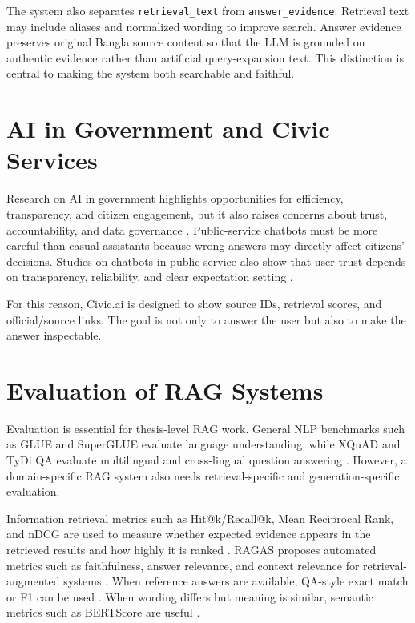 The system also separates \texttt{retrieval\_text} from \texttt{answer\_evidence}. Retrieval text may include aliases and normalized wording to improve search. Answer evidence preserves original Bangla source content so that the LLM is grounded on authentic evidence rather than artificial query-expansion text. This distinction is central to making the system both searchable and faithful.

\section{AI in Government and Civic Services}
Research on AI in government highlights opportunities for efficiency, transparency, and citizen engagement, but it also raises concerns about trust, accountability, and data governance \cite{pislaru2024citizen,alhosani2024ai_government,andrews2022trust}. Public-service chatbots must be more careful than casual assistants because wrong answers may directly affect citizens' decisions. Studies on chatbots in public service also show that user trust depends on transparency, reliability, and clear expectation setting \cite{larsen2024public_service_chatbots,lin2023government_chatbots,mehr2017ai_government}.

For this reason, Civic.ai is designed to show source IDs, retrieval scores, and official/source links. The goal is not only to answer the user but also to make the answer inspectable.

\section{Evaluation of RAG Systems}
Evaluation is essential for thesis-level RAG work. General NLP benchmarks such as GLUE and SuperGLUE evaluate language understanding, while XQuAD and TyDi QA evaluate multilingual and cross-lingual question answering \cite{wang2018glue,wang2019superglue,artetxe2019xquad,clark2020tydiqa}. However, a domain-specific RAG system also needs retrieval-specific and generation-specific evaluation.

Information retrieval metrics such as Hit@k/Recall@k, Mean Reciprocal Rank, and nDCG are used to measure whether expected evidence appears in the retrieved results and how highly it is ranked \cite{manning2008ir,voorhees1999trec8qa,jarvelin2002ndcg}. RAGAS proposes automated metrics such as faithfulness, answer relevance, and context relevance for retrieval-augmented systems \cite{es2024ragas}. When reference answers are available, QA-style exact match or F1 can be used \cite{rajpurkar2016squad}. When wording differs but meaning is similar, semantic metrics such as BERTScore are useful \cite{zhang2020bertscore}.

